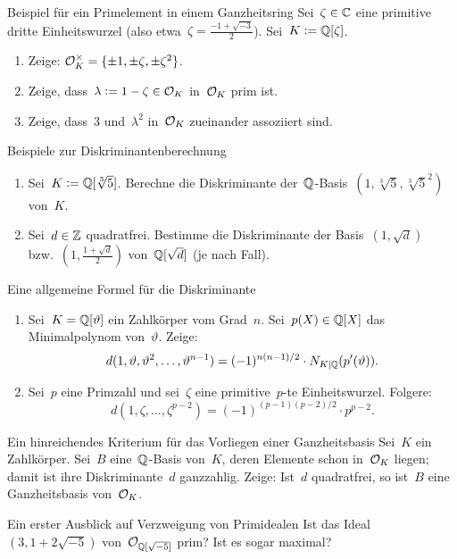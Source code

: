 \documentclass{uebblatt}
\begin{document}

\begin{aufgabe}{Beispiel für ein Primelement in einem Ganzheitsring}
Sei~$\zeta \in \mathbb{C}$ eine primitive dritte Einheitswurzel (also etwa~$\zeta =
\frac{-1+\sqrt{-3}}{2}$). Sei~$K \vcentcolon= \mathbb{Q}[\zeta]$.
\begin{enumerate}
\item Zeige: $\mathcal{O}_K^\times = \{ \pm 1, \pm \zeta, \pm \zeta^2 \}$.
\item Zeige, dass~$\lambda \vcentcolon= 1 - \zeta \in \mathcal{O}_K$ in~$\mathcal{O}_K$ prim ist.
\item Zeige, dass~$3$ und~$\lambda^2$ in~$\mathcal{O}_K$ zueinander assoziiert sind.
\end{enumerate}
\end{aufgabe}

\begin{aufgabe}{Beispiele zur Diskriminantenberechnung}
\begin{enumerate}
\item Sei~$K \vcentcolon= \mathbb{Q}[\sqrt[3]{5}]$. Berechne die Diskriminante
der~$\mathbb{Q}$-Basis~$(1,\sqrt[3]{5},\sqrt[3]{5}^2)$ von~$K$.
\item Sei~$d \in \mathbb{Z}$ quadratfrei. Bestimme die Diskriminante der
Basis~$(1,\sqrt{d})$ bzw.~$(1,\frac{1+\sqrt{d}}{2})$ von~$\mathbb{Q}[\sqrt{d}]$ (je
nach Fall).
\end{enumerate}
\end{aufgabe}

\begin{aufgabe}{Eine allgemeine Formel für die Diskriminante}
\begin{enumerate}
\item Sei~$K = \mathbb{Q}[\vartheta]$ ein Zahlkörper vom Grad~$n$. Sei~$p(X) \in \mathbb{Q}[X]$ das
Minimalpolynom von~$\vartheta$. Zeige:
\[ d(1,\vartheta,\vartheta^2,\ldots,\vartheta^{n-1}) =
  (-1)^{n(n-1)/2} \cdot N_{K|\mathbb{Q}}(p'(\vartheta)). \]
\item Sei~$p$ eine Primzahl und sei~$\zeta$ eine primitive~$p$-te
Einheitswurzel. Folgere:
\[ d(1,\zeta,\ldots,\zeta^{p-2}) =
  (-1)^{(p-1)(p-2)/2} \cdot p^{p-2}. \]
\end{enumerate}
\vspace*{-1em}
\end{aufgabe}

\begin{aufgabe}{Ein hinreichendes Kriterium für das Vorliegen einer Ganzheitsbasis}
Sei~$K$ ein Zahlkörper. Sei~$B$ eine~$\mathbb{Q}$-Basis von~$K$, deren Elemente schon
in~$\mathcal{O}_K$ liegen; damit ist ihre Diskriminante~$d$ ganzzahlig. Zeige: Ist~$d$
quadratfrei, so ist~$B$ eine Ganzheitsbasis von~$\mathcal{O}_K$.
\end{aufgabe}

\begin{aufgabe}{Ein erster Ausblick auf Verzweigung von Primidealen}
Ist das Ideal~$(3, 1+2\sqrt{-5})$ von~$\mathcal{O}_{\mathbb{Q}[\sqrt{-5}]}$ prim? Ist es sogar
maximal?
\end{aufgabe}
\end{document}
